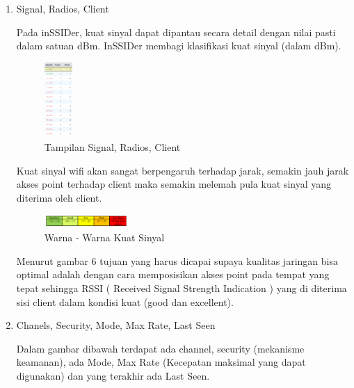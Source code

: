 \documentclass[conference]{IEEEtran}
\begin{document}
\begin{enumerate}
    \item Signal, Radios, Client
    \vspace{0.2cm}
    
    Pada inSSIDer, kuat sinyal dapat dipantau secara detail dengan nilai pasti dalam satuan dBm. InSSIDer membagi klasifikasi kuat sinyal (dalam dBm).
    
    \begin{figure}[h]
        \centering
        \includegraphics[width=0.1\textwidth]{5.png}
        \caption{Tampilan Signal, Radios, Client}
    \end{figure}
    \vspace{0.2cm}
    
    Kuat sinyal wifi akan sangat berpengaruh terhadap jarak, semakin jauh jarak akses point terhadap client maka semakin melemah pula kuat sinyal yang diterima oleh client.
    
    \begin{figure}[h]
        \centering
        \includegraphics[width=0.3\textwidth]{6.png}
        \caption{Warna - Warna Kuat Sinyal}
    \end{figure}
    \vspace{0.2cm}
    
    Menurut gambar 6 tujuan yang harus dicapai supaya kualitas jaringan bisa optimal adalah dengan cara memposisikan akses point pada tempat yang tepat sehingga RSSI ( Received Signal Strength Indication ) yang di diterima sisi client dalam kondisi kuat (good dan excellent).
    
    \vspace{0.3cm}
    
    \item Chanels, Security, Mode, Max Rate, Last Seen
    
    \vspace{0.4cm}
    
    Dalam gambar dibawah terdapat ada channel, security (mekanisme keamanan), ada Mode, Max Rate (Kecepatan maksimal yang dapat digunakan) dan yang terakhir ada Last Seen.
    

\end{enumerate}
\end{document}
